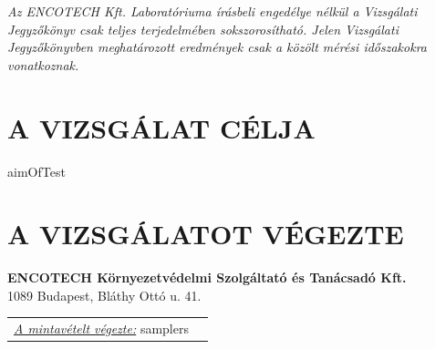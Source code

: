 \documentclass[a4paper,12pt]{article}
\begin{document}
	\begin{center}
		{\scriptsize 
			\textit{
				Az ENCOTECH Kft. Laboratóriuma írásbeli engedélye nélkül a Vizsgálati Jegyzőkönyv csak teljes terjedelmében sokszorosítható. 
				Jelen Vizsgálati Jegyzőkönyvben meghatározott eredmények csak a közölt mérési időszakokra vonatkoznak.
		}}  
	\end{center}
	
	\newpage
	

	\tableofcontents
	

	\newpage  %
	\pagestyle{report}
	
	
	\section{A VIZSGÁLAT CÉLJA}
		\begin{adjustwidth}{1cm}{0cm}
		{{aimOfTest}}
		\end{adjustwidth}
	
	
	\section{A VIZSGÁLATOT VÉGEZTE}
		\begin{adjustwidth}{1cm}{0cm}
			\noindent
			\textbf{ENCOTECH Környezetvédelmi Szolgáltató és Tanácsadó Kft.} \\
			1089 Budapest, Bláthy Ottó u. 41.
			
			\vspace{1.0em} %
			
			\noindent
			\begin{tabular}{ p{5.5cm} p{8cm} } 
				\textit{\underline{A mintavételt végezte:}} {{samplers}}
			\end{tabular}
		\end{adjustwidth}
	
	
\end{document}
